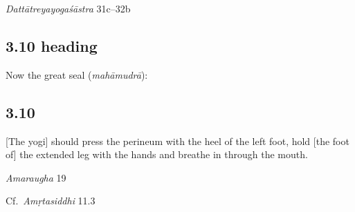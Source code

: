 \begin{ekdosis}
\begin{sources}[hp03_009_1]
\emph{Dattātreyayogaśāstra} 31c–32b
\begin{versinnote}
\tl{\var{vajrolī ] vajrolir \vl • cāmarolī ] amaroliś \vl • sahajolī ] sahajolis \vl}\\!}
\end{versinnote}
\end{sources}



\subsection*{3.10 heading}
\begin{translation}[hp03_010a]
Now the great seal (\emph{mahāmudrā}):
\end{translation}


\subsection*{3.10}
\begin{translation}[hp03_010]
{}[The yogi] should press the perineum with the heel of the left foot, hold [the foot of] the extended leg with the hands and breathe in through the mouth.
\end{translation}

\begin{sources}[hp03_010]
\emph{Amaraugha} 19
\begin{versinnote}
\tl{\var{dhṛtvā ] kṛtvā \vl}\\!}
\end{versinnote}

Cf.~\emph{Amṛtasiddhi} 11.3
\begin{versinnote}
\end{versinnote}
\end{sources}


\end{ekdosis}
